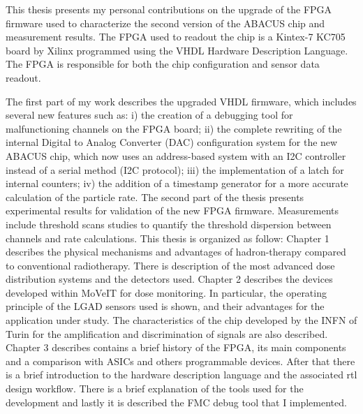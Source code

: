 \newpage
\thispagestyle{plain}
This thesis presents my personal contributions on the upgrade of the FPGA firmware used to characterize
the second version of the ABACUS chip and measurement results.
The FPGA used to readout the chip is a Kintex-7 KC705 board by Xilinx programmed using the VHDL Hardware Description Language. The FPGA
is responsible for both the chip configuration and sensor data readout.

\noindent The first part of my work describes the upgraded VHDL firmware, which includes several new features such as:
i) the creation of a debugging tool for malfunctioning channels on the FPGA board;
ii) the complete rewriting of the internal Digital to Analog Converter (DAC) configuration system for the new ABACUS chip, which
now uses an address-based system with an I2C controller instead of a serial method (I2C protocol);
iii) the implementation of a latch for internal counters;
iv) the addition of a timestamp generator for a more accurate calculation of the particle rate.
\newline
The second part of the thesis presents experimental results for validation of the new FPGA firmware.
Measurements include threshold scans studies to quantify the threshold dispersion between channels and rate calculations.
\vspace{1cm}
\newline
This thesis is organized as follow:
\vspace{0.25cm}
\newline
Chapter 1 describes the physical mechanisms and advantages of hadron-therapy compared to conventional radiotherapy. There is description of the most advanced dose distribution systems and the detectors used.
\vspace{0.25cm}
\newline
Chapter 2 describes the devices developed within MoVeIT for dose monitoring. In particular, the operating principle of the LGAD sensors used is shown, and their advantages for the application under study. The characteristics of the chip developed by the INFN of Turin for the amplification and discrimination of signals are also described.
\vspace{0.25cm}
\newline
Chapter 3 describes contains a brief history of the FPGA, its main components and a comparison with ASICs and others programmable devices. After that there is a brief introduction to the hardware description language and the associated rtl design workflow. There is a brief explanation of the tools used for the development and lastly it is described the FMC debug tool that I implemented.
